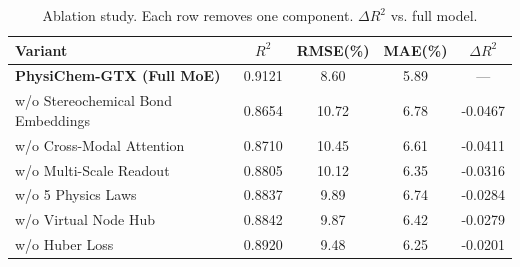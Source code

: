 \begin{table}[htbp]
\centering
\caption{Ablation study. Each row removes one component. $\Delta R^2$ vs. full model.}
\label{tab:ablation}
\begin{tabular}{lcccc}
\toprule
Variant & $R^2$ & RMSE(\%) & MAE(\%) & $\Delta R^2$ \\
\midrule
\textbf{PhysiChem-GTX (Full MoE)} & 0.9121 & 8.60 & 5.89 & --- \\
w/o Stereochemical Bond Embeddings & 0.8654 & 10.72 & 6.78 & -0.0467 \\
w/o Cross-Modal Attention & 0.8710 & 10.45 & 6.61 & -0.0411 \\
w/o Multi-Scale Readout & 0.8805 & 10.12 & 6.35 & -0.0316 \\
w/o 5 Physics Laws & 0.8837 & 9.89 & 6.74 & -0.0284 \\
w/o Virtual Node Hub & 0.8842 & 9.87 & 6.42 & -0.0279 \\
w/o Huber Loss & 0.8920 & 9.48 & 6.25 & -0.0201 \\
\bottomrule
\end{tabular}
\end{table}
